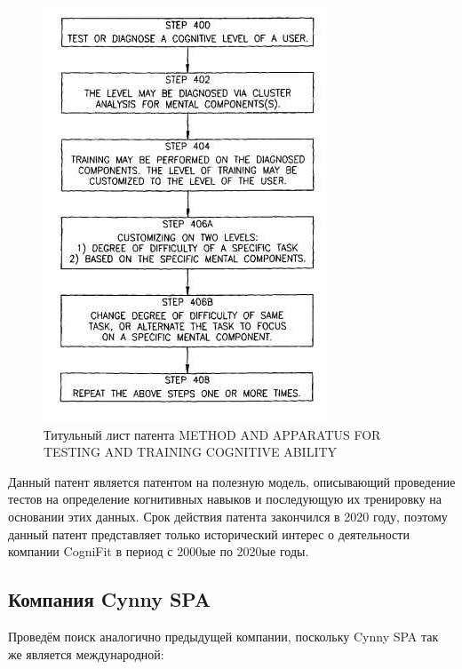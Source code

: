 \documentclass[12pt]{article}
\begin{document}
    \begin{figure}[ht]
        \centering
        \includegraphics[scale=0.8]{images/2.png}
        \caption{Титульный лист патента METHOD AND APPARATUS FOR TESTING AND TRAINING COGNITIVE ABILITY}
        \label{fig:o:2}
    \end{figure}

    Данный патент является патентом на полезную модель, описывающий проведение тестов на определение когнитивных навыков и последующую их тренировку на основании этих данных.
    Срок действия патента закончился в 2020 году, поэтому данный патент представляет только исторический интерес о деятельности компании CogniFit в период с 2000ые по 2020ые годы.

    \subsection{Компания Cynny SPA}

    Проведём поиск аналогично предыдущей компании, поскольку Cynny SPA так же является международной:
\end{document}
